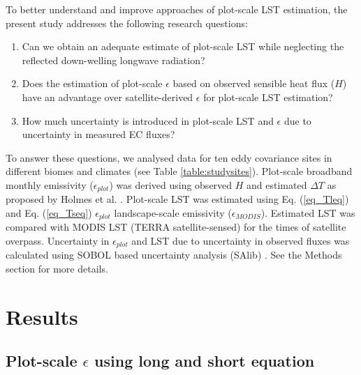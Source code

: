\documentclass[fleqn,10pt]{wlscirep}
\begin{document}
To better understand and improve approaches of plot-scale LST estimation, the present study addresses the following research questions:
\begin{enumerate}
	\item Can we obtain an adequate estimate of plot-scale LST while neglecting the reflected down-welling longwave radiation?
	\item Does the estimation of plot-scale $\epsilon$ based on observed sensible heat flux ($H$) have an advantage over satellite-derived $\epsilon$ for plot-scale LST estimation?   
    \item How much uncertainty is introduced in plot-scale LST and $\epsilon$ due to uncertainty in measured EC fluxes?    
\end{enumerate}    

To answer these questions, we analysed data for ten eddy covariance sites in different biomes and climates (see Table \ref{table:studysites}).
Plot-scale broadband monthly emissivity ($\epsilon_{plot}$) was derived using observed $H$ and estimated $\Delta T$ as proposed by Holmes et al. \cite{holmes2009land}. Plot-scale LST was estimated using Eq. (\ref{eq_Tleq}) and Eq. (\ref{eq_Tseq}) $\epsilon_{plot}$ landscape-scale emissivity ($\epsilon_{MODIS}$). Estimated LST was compared with MODIS LST (TERRA satellite-sensed) for the times of satellite overpass. Uncertainty in $\epsilon_{plot}$ and LST due to uncertainty in observed fluxes was calculated using SOBOL based uncertainty analysis (SAlib) \cite{rosolem2012fully}. See the Methods section for more details.

\section{Results}

\subsection{Plot-scale $\epsilon$ using long and short equation}
\end{document}
